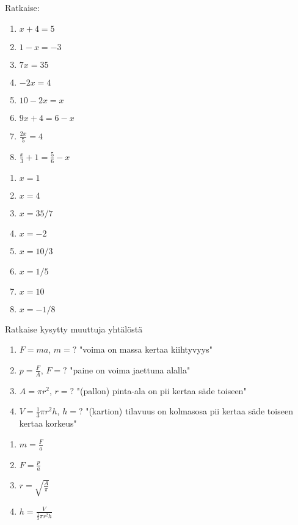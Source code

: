 \begin{tehtava}
%
Ratkaise:
\begin{enumerate}
\item $x + 4 = 5$
\item $1 - x = -3$
\item $7x = 35$
\item $-2x = 4$
\item $10 - 2x = x$
\item $9x + 4 = 6 - x$
\item $\frac{2x}{5} = 4$
\item $\frac{x}{3} + 1 = \frac{5}{6} - x$
\end{enumerate}
\begin{vastaus}
\begin{enumerate}
\item $x=1$
\item $x=4$
\item $x=35/7$
\item $x=-2$
\item $x=10/3$
\item $x=1/5$
\item $x=10$
\item $x=-1/8$
\end{enumerate}
\end{vastaus}
\end{tehtava}

\begin{tehtava}
Ratkaise kysytty muuttuja yhtälöstä
\begin{enumerate}
\item $F=ma$, $m=?$ "voima on massa kertaa kiihtyvyys"
\item $p=\frac{F}{A}$, $F=?$ "paine on voima jaettuna alalla"
\item $A=\pi r^2$, $r=?$ "(pallon) pinta-ala on pii kertaa säde toiseen"
\item $V=\frac{1}{3} \pi r^2 h$, $h=?$ "(kartion) tilavuus on kolmasosa pii kertaa säde toiseen kertaa korkeus"
\end{enumerate}
\begin{vastaus}
\begin{enumerate}
\item $m=\frac{F}{a}$
\item $F=\frac{p}{a}$
\item $r=\sqrt{\frac{A}{\pi}}$
\item $h=\frac{V}{ \frac{1}{3} \pi r^2 h}$
\end{enumerate}
\end{vastaus}
\end{tehtava}

